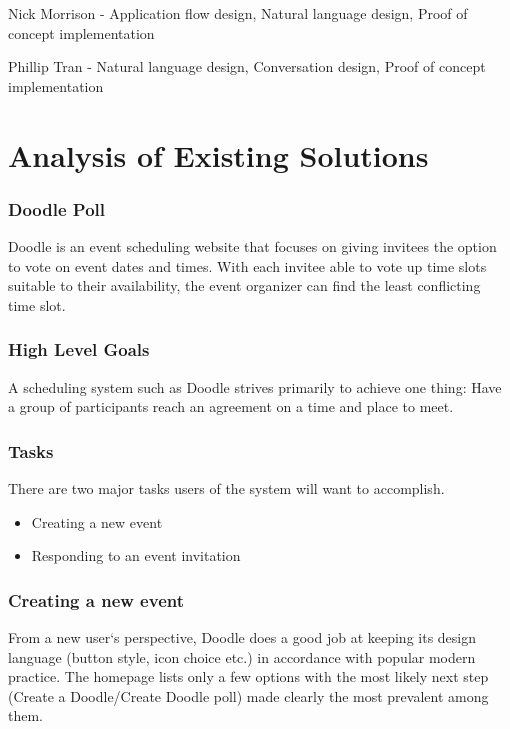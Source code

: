 \documentclass{sigchi}
\begin{document}
Nick Morrison - Application flow design, Natural language design, Proof of concept implementation

Phillip Tran - Natural language design, Conversation design, Proof of concept implementation


\section{Analysis of Existing Solutions}

\subsubsection{Doodle Poll}


Doodle is an event scheduling website that focuses on giving invitees the option to vote on event dates and times. With each invitee able to vote up time slots suitable to their availability, the event organizer can find the least conflicting time slot.

\subsubsection{High Level Goals}

A scheduling system such as Doodle strives primarily to achieve one
thing: Have a group of participants reach an agreement on a time and
place to meet.

\subsubsection{Tasks}

There are two major tasks users of the system will want
to accomplish.

\begin{itemize}
\item Creating a new event
\item Responding to an event invitation
\end{itemize}

\subsubsection{Creating a new event}

From a new user`s perspective, Doodle does a good job at keeping its
design language (button style, icon choice etc.) in accordance with
popular modern practice. The homepage lists only a few options with
the most likely next step (Create a Doodle/Create Doodle poll) made
clearly the most prevalent among them.
\end{document}
